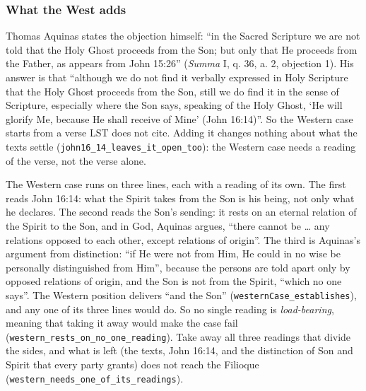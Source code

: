 \documentclass[11pt,paper=\testimonypaper,DIV=13,parskip=false]{scrartcl}
\begin{document}
\subsubsection*{What the West adds}
Thomas Aquinas states the objection himself: “in the Sacred Scripture we are not told that the Holy Ghost proceeds from the Son; but only that He proceeds from the Father, as appears from John 15:26” (\emph{Summa} I, q. 36, a. 2, objection 1). His answer is that “although we do not find it verbally expressed in Holy Scripture that the Holy Ghost proceeds from the Son, still we do find it in the sense of Scripture, especially where the Son says, speaking of the Holy Ghost, ‘He will glorify Me, because He shall receive of Mine’ (John 16:14)”. So the Western case starts from a verse LST does not cite. Adding it changes nothing about what the texts settle (\texttt{john16\_\allowbreak{}14\_\allowbreak{}leaves\_\allowbreak{}it\_\allowbreak{}open\_\allowbreak{}too}): the Western case needs a reading of the verse, not the verse alone.

The Western case runs on three lines, each with a reading of its own. The first reads John 16:14: what the Spirit takes from the Son is his being, not only what he declares. The second reads the Son’s sending: it rests on an eternal relation of the Spirit to the Son, and in God, Aquinas argues, “there cannot be … any relations opposed to each other, except relations of origin”. The third is Aquinas’s argument from distinction: “if He were not from Him, He could in no wise be personally distinguished from Him”, because the persons are told apart only by opposed relations of origin, and the Son is not from the Spirit, “which no one says”. The Western position delivers “and the Son” (\texttt{western\allowbreak{}Case\_\allowbreak{}establishes}), and any one of its three lines would do. So no single reading is \emph{load-bearing}, meaning that taking it away would make the case fail (\texttt{western\_\allowbreak{}rests\_\allowbreak{}on\_\allowbreak{}no\_\allowbreak{}one\_\allowbreak{}reading}). Take away all three readings that divide the sides, and what is left (the texts, John 16:14, and the distinction of Son and Spirit that every party grants) does not reach the Filioque (\texttt{western\_\allowbreak{}needs\_\allowbreak{}one\_\allowbreak{}of\_\allowbreak{}its\_\allowbreak{}readings}).
\end{document}
